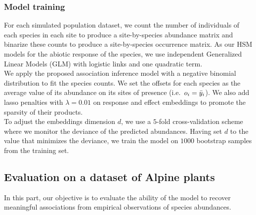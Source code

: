 \documentclass[10pt,a4paper]{article}
\begin{document}
\subsubsection{Model training}
For each simulated population dataset, we count the number of individuals of each species in each site to produce a site-by-species abundance matrix and binarize these counts to produce a site-by-species occurrence matrix. 
As our HSM models for the abiotic response of the species, we use independent Generalized Linear Models (GLM) with logistic links and one quadratic term.\\

We apply the proposed association inference model with a negative binomial distribution to fit the species counts. We set the offsets for each species as the average value of its abundance on its sites of presence (i.e.\ $o_i=\bar{y}_{i}$). We also add lasso penalties with $\lambda=0.01$ on response and effect embeddings to promote the sparsity of their products. \\

To adjust the embeddings dimension $d$, we use a $5$-fold cross-validation scheme where we monitor the deviance of the predicted abundances. Having set $d$ to the value that minimizes the deviance, we train the model on $1000$ bootstrap samples from the training set.

\subsection{Evaluation on a dataset of Alpine plants}
In this part, our objective is to evaluate the ability of the model to recover meaningful associations from empirical observations of species abundances.
\end{document}
